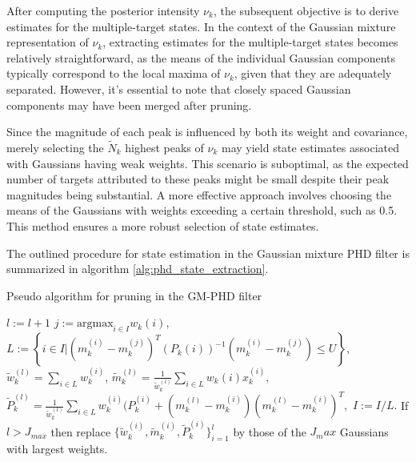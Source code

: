 After computing the posterior intensity $\nu_k$, the subsequent objective is to derive estimates for the multiple-target states. In the context of the Gaussian mixture representation of $\nu_k$, extracting estimates for the multiple-target states becomes relatively straightforward, as the means of the individual Gaussian components typically correspond to the local maxima of $\nu_k$, given that they are adequately separated. However, it's essential to note that closely spaced Gaussian components may have been merged after pruning.

Since the magnitude of each peak is influenced by both its weight and covariance, merely selecting the $\tilde{N}_k$ highest peaks of $\nu_k$ may yield state estimates associated with Gaussians having weak weights. This scenario is suboptimal, as the expected number of targets attributed to these peaks might be small despite their peak magnitudes being substantial. A more effective approach involves choosing the means of the Gaussians with weights exceeding a certain threshold, such as 0.5. This method ensures a more robust selection of state estimates.

The outlined procedure for state estimation in the Gaussian mixture PHD filter is summarized in algorithm \ref{alg:phd_state_extraction}.

\begin{algorithm}
    \caption{Pseudo algorithm for pruning in the GM-PHD filter}
    \begin{algorithmic}[1]
            \State $l:= l+1$
            \State $j:= \text{argmax}_{i \in I} w_k{(i)},$
            \State $L:= \left\{ i \in I | (m_k^{(i)} - m_k^{(j)})^T (P_k{(i)})^{-1} (m_k^{(i)} - m_k^{(j)}) \leq U \right\},$
            \State $\tilde{w}_k^{(l)} = \sum_{i \in L} w_k^{(i)}$,
            \State $\tilde{m}_k^{(l)} = \frac{1}{\tilde{w}_k^{(l)}} \sum_{i \in L} w_k{(i)} x_k^{(i)},$
            \State $\tilde{P}_k^{(l)} = \frac{1}{\tilde{w}_k^{(l)}} \sum_{i \in L} w_k^{(i)} (P_k^{(i)} + (m_k^{(l)} - m _k^{(i)}) (m_k^{(l)} - m _k^{(i)})^T,$
            \State $I:= I/L.$
        \EndWhile
        \EndProcedure
        \State
        \State If $l > J_{max}$ then replace $\{ \tilde{w}_k^{(i)}, \tilde{m}_k^{(i)}, \tilde{P}_k^{(i)} \}_{i=1}^l$
        by those of the $J_max$ Gaussians with largest weights.
        \State

    \end{algorithmic}
    \label{alg:phd_merging}
\end{algorithm}

